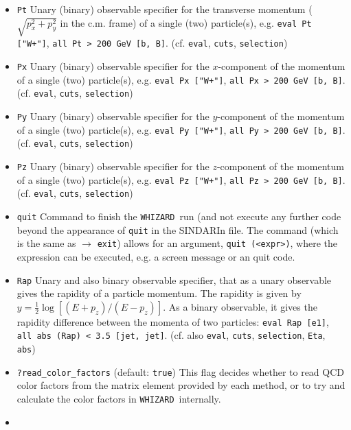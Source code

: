 \documentclass[12pt]{book}
\newcommand{\ttt}[1]{\texttt{#1}}
\newcommand{\whizard}{\texttt{WHIZARD}}
\begin{document}
\begin{itemize}
\item
\ttt{Pt} \newline
Unary (binary) observable specifier for the transverse momentum
($\sqrt{p_x^2 + p_y^2}$ in the c.m. frame) of a single (two)
particle(s), e.g. \ttt{eval Pt ["W+"]}, \ttt{all Pt > 200 GeV [b,
B]}. (cf. \ttt{eval}, \ttt{cuts}, \ttt{selection})
\item
\ttt{Px} \newline
Unary (binary) observable specifier for the $x$-component of the
momentum of a single (two) particle(s), e.g. \ttt{eval Px ["W+"]},
\ttt{all Px > 200 GeV [b, B]}. (cf. \ttt{eval}, \ttt{cuts},
\ttt{selection})
\item
\ttt{Py} \newline
Unary (binary) observable specifier for the $y$-component of the
momentum of a single (two) particle(s), e.g. \ttt{eval Py ["W+"]},
\ttt{all Py > 200 GeV [b, B]}. (cf. \ttt{eval}, \ttt{cuts},
\ttt{selection})
\item
\ttt{Pz} \newline
Unary (binary) observable specifier for the $z$-component of the
momentum of a single (two) particle(s), e.g. \ttt{eval Pz ["W+"]},
\ttt{all Pz > 200 GeV [b, B]}. (cf. \ttt{eval}, \ttt{cuts},
\ttt{selection})
\item
\ttt{quit} \newline
Command to finish the \whizard\ run (and not execute any further code
beyond the appearance of \ttt{quit} in the SINDARIn file. The command
(which is the same as $\to$ \ttt{exit}) allows for an argument,
\ttt{quit (<expr>)}, where the expression can be executed, e.g. a
screen message or an quit code.
\item
\ttt{Rap} \newline
Unary and also binary observable specifier, that as a unary observable
gives the rapidity of a particle momentum. The rapidity is given by $y
= \frac12 \log \left[ (E + p_z)/(E-p_z) \right]$. As a binary
observable, it gives the rapidity difference between the momenta of
two particles: \ttt{eval Rap [e1]},  \ttt{all abs (Rap) < 3.5 [jet,
  jet]}. (cf. also \ttt{eval}, \ttt{cuts}, \ttt{selection}, \ttt{Eta},
\ttt{abs})  
\item
\ttt{?read\_color\_factors} \qquad (default: \ttt{true}) \newline
This flag decides whether to read QCD color factors from the matrix
element provided by each method, or to try and calculate the color
factors in \whizard\ internally.
\item

\end{itemize}
\end{document}
